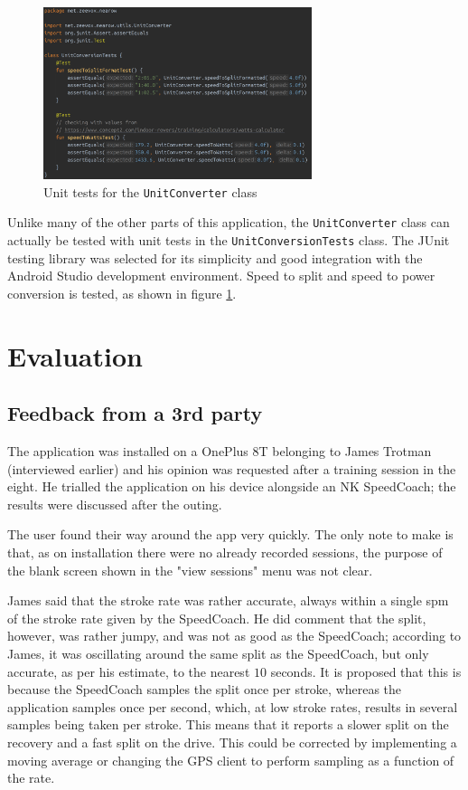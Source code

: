 \documentclass[11pt,twoside,a4paper]{report}
\begin{document}
\begin{figure}[h!]
  \centering
  \includegraphics[width=0.7\textwidth]{code-UnitConversionTests.png}
  \caption{Unit tests for the \texttt{UnitConverter} class}
  \label{fig:UnitConversionTests}
\end{figure}

Unlike many of the other parts of this application, the \texttt{UnitConverter} class can actually be tested with unit tests in the \texttt{UnitConversionTests} class. The JUnit testing library was selected for its simplicity and good integration with the Android Studio development environment. Speed to split and speed to power conversion is tested, as shown in figure \ref{fig:UnitConversionTests}.

\chapter{Evaluation}

\section{Feedback from a 3rd party}

The application was installed on a OnePlus 8T belonging to James Trotman (interviewed earlier) and his opinion was requested after a training session in the eight. He trialled the application on his device alongside an NK SpeedCoach; the results were discussed after the outing. 

The user found their way around the app very quickly. The only note to make is that, as on installation there were no already recorded sessions, the purpose of the blank screen shown in the "view sessions" menu was not clear.

James said that the stroke rate was rather accurate, always within a single spm of the stroke rate given by the SpeedCoach. He did comment that the split, however, was rather jumpy, and was not as good as the SpeedCoach; according to James, it was oscillating around the same split as the SpeedCoach, but only accurate, as per his estimate, to the nearest $10$ seconds. It is proposed that this is because the SpeedCoach samples the split once per stroke, whereas the application samples once per second, which, at low stroke rates, results in several samples being taken per stroke. This means that it reports a slower split on the recovery and a fast split on the drive. This could be corrected by implementing a moving average or changing the GPS client to perform sampling as a function of the rate.
\end{document}
